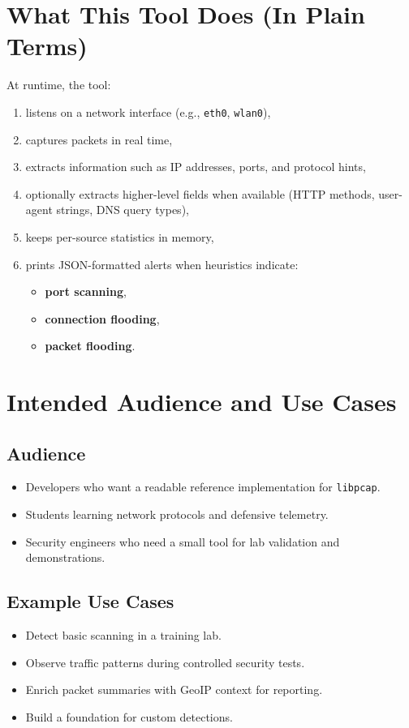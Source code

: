 \documentclass[14pt]{extarticle}
\begin{document}
\section{What This Tool Does (In Plain Terms)}
At runtime, the tool:
\begin{enumerate}
  \item listens on a network interface (e.g., \texttt{eth0}, \texttt{wlan0}),
  \item captures packets in real time,
  \item extracts information such as IP addresses, ports, and protocol hints,
  \item optionally extracts higher-level fields when available (HTTP methods, user-agent strings, DNS query types),
  \item keeps per-source statistics in memory,
  \item prints JSON-formatted alerts when heuristics indicate:
  \begin{itemize}
    \item \textbf{port scanning},
    \item \textbf{connection flooding},
    \item \textbf{packet flooding}.
  \end{itemize}
\end{enumerate}

\section{Intended Audience and Use Cases}
\subsection{Audience}
\begin{itemize}
  \item Developers who want a readable reference implementation for \texttt{libpcap}.
  \item Students learning network protocols and defensive telemetry.
  \item Security engineers who need a small tool for lab validation and demonstrations.
\end{itemize}

\subsection{Example Use Cases}
\begin{itemize}
  \item Detect basic scanning in a training lab.
  \item Observe traffic patterns during controlled security tests.
  \item Enrich packet summaries with GeoIP context for reporting.
  \item Build a foundation for custom detections.
\end{itemize}
\end{document}
